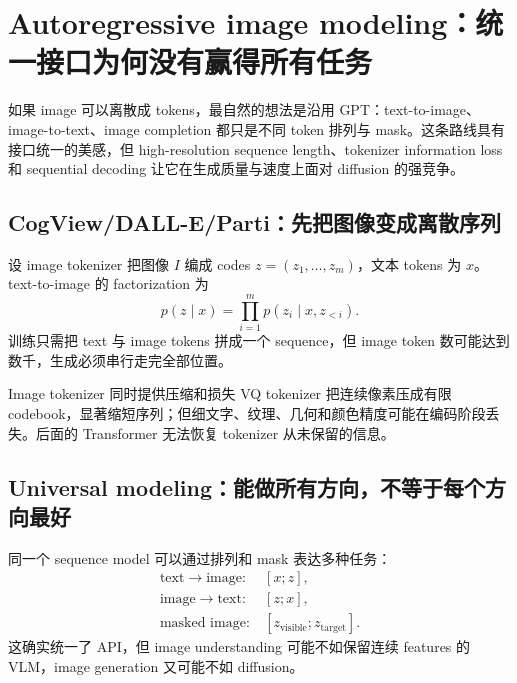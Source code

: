 \section{Autoregressive image modeling：统一接口为何没有赢得所有任务}

如果 image 可以离散成 tokens，最自然的想法是沿用 GPT：text-to-image、image-to-text、image completion 都只是不同 token 排列与 mask。这条路线具有接口统一的美感，但 high-resolution sequence length、tokenizer information loss 和 sequential decoding 让它在生成质量与速度上面对 diffusion 的强竞争。

\subsection{CogView/DALL-E/Parti：先把图像变成离散序列}

设 image tokenizer 把图像 $I$ 编成 codes $z=(z_1,\ldots,z_m)$，文本 tokens 为 $x$。text-to-image 的 factorization 为
\[
p(z\mid x)=\prod_{i=1}^{m}p(z_i\mid x,z_{<i}).
\]
训练只需把 text 与 image tokens 拼成一个 sequence，但 image token 数可能达到数千，生成必须串行走完全部位置。


\begin{importantbox}{Image tokenizer 同时提供压缩和损失}
VQ tokenizer 把连续像素压成有限 codebook，显著缩短序列；但细文字、纹理、几何和颜色精度可能在编码阶段丢失。后面的 Transformer 无法恢复 tokenizer 从未保留的信息。
\end{importantbox}


\subsection{Universal modeling：能做所有方向，不等于每个方向最好}

同一个 sequence model 可以通过排列和 mask 表达多种任务：
\[
\begin{aligned}
\text{text}\rightarrow\text{image}:&\ [x;z],\\
\text{image}\rightarrow\text{text}:&\ [z;x],\\
\text{masked image}:&\ [z_{\text{visible}};z_{\text{target}}].
\end{aligned}
\]
这确实统一了 API，但 image understanding 可能不如保留连续 features 的 VLM，image generation 又可能不如 diffusion。

